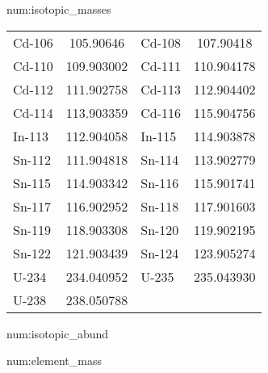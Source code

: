 \begin{numitem}{num:isotopic_masses}
\begin{center}
\begin{tabular}{l c l c}
Cd-106 & 105.90646      & Cd-108 & 107.90418      \\
Cd-110 & 109.903002     & Cd-111 & 110.904178     \\
Cd-112 & 111.902758     & Cd-113 & 112.904402     \\
Cd-114 & 113.903359     & Cd-116 & 115.904756     \\
In-113 & 112.904058     & In-115 & 114.903878     \\
Sn-112 & 111.904818     & Sn-114 & 113.902779     \\
Sn-115 & 114.903342     & Sn-116 & 115.901741     \\
Sn-117 & 116.902952     & Sn-118 & 117.901603     \\
Sn-119 & 118.903308     & Sn-120 & 119.902195     \\
Sn-122 & 121.903439     & Sn-124 & 123.905274     \\
 U-234 & 234.040952     &  U-235 & 235.043930     \\
 U-238 & 238.050788     & \\
    \bottomrule
  \end{tabular}
 \end{center}
\end{numitem}

\begin{numitem}{num:isotopic_abund}
 \begin{center}

 \end{center}
\end{numitem}

\begin{numitem}{num:element_mass}
 \begin{center}

 \end{center}
\end{numitem}

